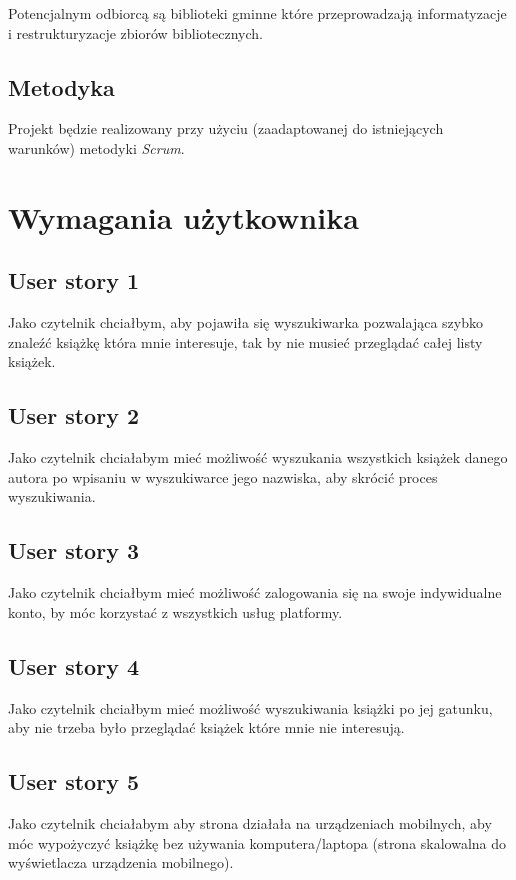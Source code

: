 \documentclass[a4paper]{article}
\begin{document}
Potencjalnym odbiorcą są biblioteki gminne które przeprowadzają informatyzacje i restrukturyzacje zbiorów bibliotecznych.

\subsection{Metodyka}

Projekt będzie realizowany przy użyciu (zaadaptowanej do istniejących warunków) metodyki {\em Scrum}. 

\section{Wymagania użytkownika}

\subsection{User story 1}
Jako czytelnik chciałbym, aby pojawiła się wyszukiwarka pozwalająca szybko znaleźć książkę która mnie interesuje, tak by nie musieć przeglądać całej listy książek.

\subsection{User story 2}
Jako czytelnik chciałabym mieć możliwość wyszukania wszystkich książek danego autora po wpisaniu w wyszukiwarce jego  nazwiska, aby skrócić proces wyszukiwania.

\subsection{User story 3}
Jako czytelnik chciałbym mieć możliwość zalogowania się na swoje indywidualne konto, by móc korzystać z wszystkich usług platformy.

\subsection{User story 4}
Jako czytelnik chciałbym mieć możliwość wyszukiwania książki po jej gatunku, aby nie trzeba było przeglądać książek które mnie nie interesują.

\subsection{User story 5}
Jako czytelnik chciałabym aby strona działała na urządzeniach mobilnych, aby móc wypożyczyć książkę bez używania komputera/laptopa (strona skalowalna do wyświetlacza urządzenia mobilnego).
\end{document}
